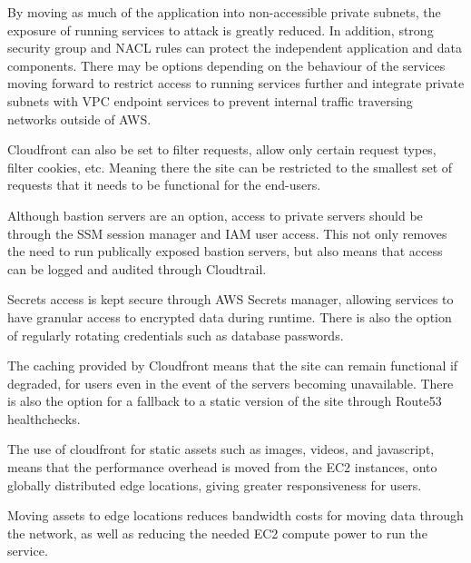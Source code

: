 


By moving as much of the application into non-accessible private subnets, the exposure of running services to attack is greatly reduced. In addition, strong security group and NACL rules can protect the independent application and data components. There may be options depending on the behaviour of the services moving forward to restrict access to running services further and integrate private subnets with VPC endpoint services to prevent internal traffic traversing networks outside of AWS.

Cloudfront can also be set to filter requests, allow only certain request types, filter cookies, etc. Meaning there the site can be restricted to the smallest set of requests that it needs to be functional for the end-users.

Although bastion servers are an option, access to private servers should be through the SSM session manager and IAM user access. This not only removes the need to run publically exposed bastion servers, but also means that access can be logged and audited through Cloudtrail.

Secrets access is kept secure through AWS Secrets manager, allowing services to have granular access to encrypted data during runtime. There is also the option of regularly rotating credentials such as database passwords.



The caching provided by Cloudfront means that the site can remain functional if degraded, for users even in the event of the servers becoming unavailable. There is also the option for a fallback to a static version of the site through Route53 healthchecks.


The use of cloudfront for static assets such as images, videos, and javascript, means that the performance overhead is moved from the EC2 instances, onto globally distributed edge locations, giving greater responsiveness for users.



Moving assets to edge locations reduces bandwidth costs for moving data through the network, as well as reducing the needed EC2 compute power to run the service.


